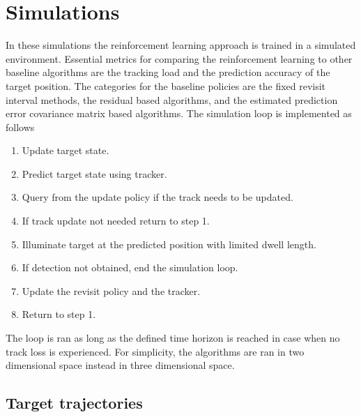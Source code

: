 \documentclass[english, 12pt, a4paper, elec, utf8, a-1b, online]{aaltothesis}
\begin{document}
\newpage
\section{Simulations}


In these simulations the reinforcement learning approach is trained in a simulated environment.
Essential metrics for comparing the reinforcement learning to other baseline algorithms are the tracking load and the prediction accuracy of the target position.
The categories for the baseline policies are the fixed revisit interval methods, the residual based algorithms, and the estimated prediction error covariance matrix based algorithms.
The simulation loop is implemented as follows
\begin{enumerate}
    \item Update target state.
    \item Predict target state using tracker.
    \item Query from the update policy if the track needs to be updated.
    \item If track update not needed return to step 1.
    \item Illuminate target at the predicted position with limited dwell length.
    \item If detection not obtained, end the simulation loop.
    \item Update the revisit policy and the tracker.
    \item Return to step 1.
\end{enumerate}
The loop is ran as long as the defined time horizon is reached in case when no track loss is experienced.
For simplicity, the algorithms are ran in two dimensional space instead in three dimensional space.

\subsection{Target trajectories}
\end{document}
